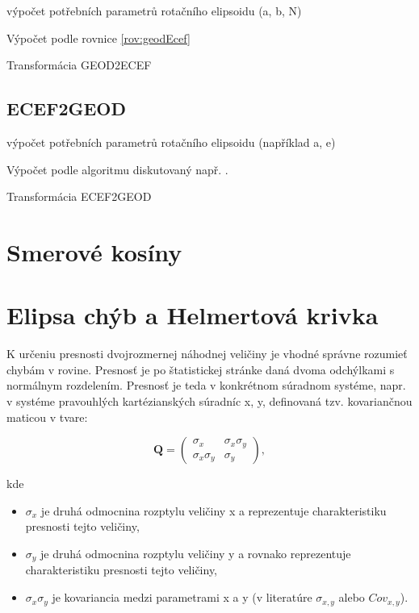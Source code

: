 \begin{algorithm}[H]
 výpočet potřebních parametrů rotačního elipsoidu (a, b, N)
 
 Výpočet podle rovnice \ref{rov:geodEcef}
 \caption{Transformácia GEOD2ECEF}
\end{algorithm} 

\subsection{ECEF2GEOD} \label{appEcef2Geod}

\begin{algorithm}[H]
 výpočet potřebních parametrů rotačního elipsoidu (například a, e)
 
 Výpočet podle algoritmu diskutovaný např. \cite{Vermeille2011}.
 \caption{Transformácia ECEF2GEOD}
\end{algorithm} 

\section{Smerové kosíny}

\section{Elipsa chýb a Helmertová krivka}

K určeniu presnosti dvojrozmernej náhodnej veličiny je vhodné správne rozumieť chybám v rovine. Presnosť je po štatistickej stránke daná dvoma odchýlkami s normálnym rozdelením. Presnosť je teda v konkrétnom súradnom systéme, napr. v systéme pravouhlých kartézianských súradníc x, y, definovaná tzv. kovariančnou maticou v tvare:

\begin{equation}\label{rov:el1}
\mathbf{Q}=
\begin{pmatrix} 
\sigma_x             & \sigma_{x}\sigma_{y}  \\  
\sigma_{x}\sigma_{y} & \sigma_{y} 
\end{pmatrix}, 
\end{equation}

kde 

\begin{itemize}
\item $\sigma_{x}$ je druhá odmocnina rozptylu veličiny x a reprezentuje charakteristiku presnosti tejto veličiny,
\item $\sigma_{y}$ je druhá odmocnina rozptylu veličiny y a rovnako reprezentuje charakteristiku presnosti tejto veličiny,
\item $\sigma_{x}\sigma_{y}$ je kovariancia medzi parametrami x a y (v literatúre $\sigma_{x, y}$ alebo $Cov_{x, y}$).
\end{itemize}
  
